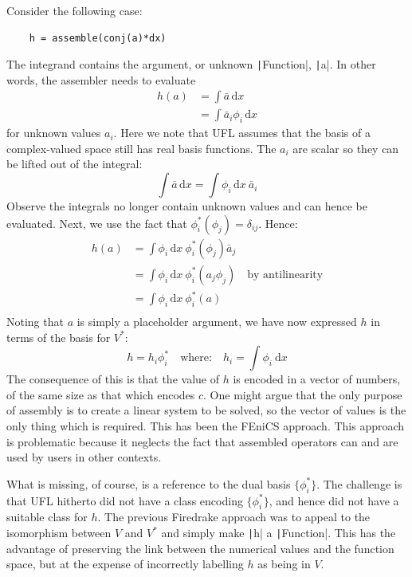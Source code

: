 \documentclass[a4paper,11pt]{article}
\begin{document}
Consider the following case:
\begin{verbatim}
    h = assemble(conj(a)*dx)
\end{verbatim}
The integrand contains the argument, or unknown \texttt|Function|, \texttt|a|. In other words, the assembler needs to evaluate
\begin{equation}
    \begin{split}
        h(a) &= \int \bar{a}\,\mathrm{d}x\\
        &= \int \bar{a}_i \phi_i\,\mathrm{d}x
    \end{split}
\end{equation}
for unknown values $a_i$. Here we note that UFL assumes that the basis of a complex-valued space still has real basis functions. The $a_i$ are scalar so they can be lifted out of the integral:
\begin{equation}
    \int \bar{a}\,\mathrm{d}x = \int \phi_i\,\mathrm{d}x\ \bar{a}_i
\end{equation}
Observe the integrals no longer contain unknown values and can hence be evaluated. 
Next, we use the fact that $\phi^*_i(\phi_j) = \delta_{ij}$. Hence:
\begin{equation}
    \begin{split}
        h(a) &= \int \phi_i\,\mathrm{d}x\ \phi^*_i(\phi_j) \bar{a}_j\\
        &= \int \phi_i\,\mathrm{d}x\ \phi^*_i(a_j\phi_j)\quad\textrm{by antilinearity}\\
        &= \int \phi_i\,\mathrm{d}x\ \phi^*_i(a)\\
    \end{split}
\end{equation}
Noting that $a$ is simply a placeholder argument, we have now expressed $h$ in terms of the basis for $V^*$: 
\begin{equation}
    h = h_i \phi^*_i\quad \textrm{where:} \quad h_i = \int \phi_i\ \mathrm{d}x \label{eq:cofunction}
\end{equation}
The consequence of this is that the value of $h$ is encoded in a vector of numbers, of the same size as that which encodes $c$. One might argue that the only purpose of assembly is to create a linear system to be solved, so the vector of values is the only thing which is required. This has been the FEniCS approach. This approach is problematic because it neglects the fact that assembled operators can and are used by users in other contexts. 

What is missing, of course, is a reference to the dual basis $\{\phi^*_i\}$. The challenge is that UFL hitherto did not have a class encoding $\{\phi^*_i\}$, and hence did not have a suitable class for $h$. The previous Firedrake approach was to appeal to the isomorphism between $V$ and $V^*$ and simply make \texttt|h| a \texttt|Function|. This has the advantage of preserving the link between the numerical values and the function space, but at the expense of incorrectly labelling $h$ as being in $V$. 
\end{document}
